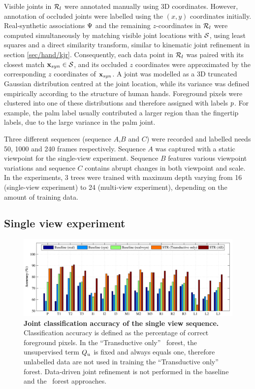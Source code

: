 Visible joints in $\mathcal{R}_{l}$ were annotated manually using 3D coordinates. However, annotation of occluded joints were labelled using the $(x,y)$ coordinates initially.  
Real-synthetic associations $\mathrm{\Psi}$ and the remaining $z$-coordinates in $\mathcal{R}_{l}$ were computed simultaneously by matching visible joint locations with $\mathcal{S}$, using least squares and a direct similarity transform, similar to kinematic joint refinement in section \ref{sec/hand/kjr}. 
Consequently, each data point in $\mathcal{R}_{l}$ was paired with its closest match $\mathbf{x}_{syn} \in \mathcal{S}$, and its occluded $z$ coordinates were approximated by the corresponding $z$ coordinates of $\mathbf{x}_{syn}$.  
A joint was modelled as a 3D truncated Gaussian distribution centred at the joint location, while its variance was defined empirically according to the structure of human hands. Foreground pixels were clustered into one of these distributions and therefore assigned with labels $p$. For example, the palm label usually contributed a larger region than the fingertip labels, due to the large variance in the palm joint.

Three different sequences (sequence $A$,$B$ and $C$) were recorded and labelled needs 50, 1000 and 240 frames respectively.  Sequence $A$ was captured with a static viewpoint for the single-view experiment. Sequence $B$ features various viewpoint variations and sequence $C$ contains abrupt changes in both viewpoint and scale. In the experiments, 3 trees were trained with maximum depth varying from 16 (single-view experiment) to 24 (multi-view experiment), depending on the amount of training data.

\subsection{Single view experiment} 

\begin{figure}[ht]
	\centering
	\includegraphics[width=1\linewidth]{fig/hand/singleview.pdf}
	\caption{\textbf{Joint classification accuracy of the single view sequence.} Classification accuracy is defined as the percentage of correct foreground pixels. 
	In the ``Transductive only'' \STR\ forest, the unsupervised term $Q_{u}$ is fixed and always equals one,  therefore unlabelled data are not used in training the ``Transductive only'' forest. 
	Data-driven joint refinement is not performed in the baseline and the \STR\ forest approaches.}
	\label{fig/hand/single}
\end{figure}

